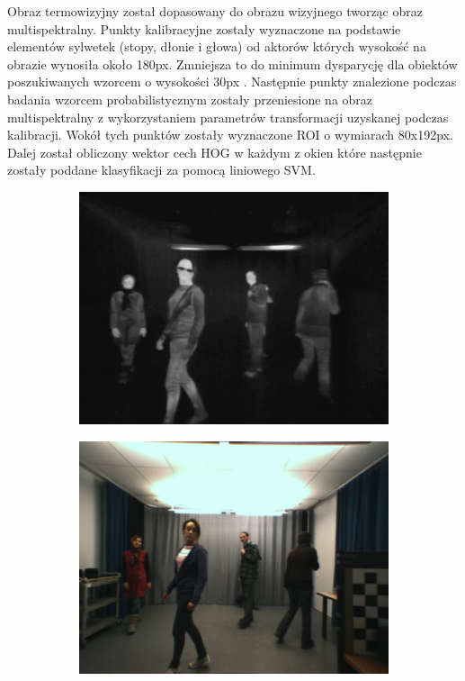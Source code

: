 Obraz termowizyjny został dopasowany do obrazu wizyjnego tworząc obraz multispektralny. Punkty kalibracyjne zostały wyznaczone na podstawie elementów sylwetek (stopy, dłonie i głowa) od aktorów których wysokość na obrazie wynosiła około 180px. Zmniejsza to do minimum dysparycję dla obiektów poszukiwanych wzorcem o wysokości 30px . Następnie punkty znalezione podczas badania wzorcem probabilistycznym zostały przeniesione na obraz multispektralny z wykorzystaniem parametrów transformacji uzyskanej podczas kalibracji. Wokół tych punktów zostały wyznaczone ROI o wymiarach 80x192px. Dalej został obliczony wektor cech HOG w każdym z okien które następnie zostały poddane klasyfikacji za pomocą liniowego SVM. 
\begin{figure}[h]
	\centering
	\begin{subfigure}{0.32\textwidth}
		\centering
		\includegraphics[width=0.9\linewidth]{images/sampleIR}
		\subcaption{\label{fig:sampleIR}}
	\end{subfigure}
	\begin{subfigure}{0.32\textwidth}
		\centering
		\includegraphics[width=0.9\linewidth]{images/sampleRGB}

\end{subfigure}
\end{figure}
